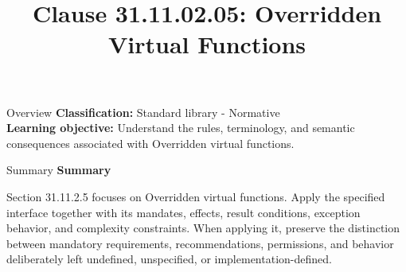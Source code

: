 \documentclass[10pt,letterpaper]{article}
\title{Clause 31.11.02.05: Overridden Virtual Functions}
\author{}
\date{}
\begin{document}
\maketitle
\begin{CornellOverviewBox}{Overview}
\textbf{Classification:} Standard library - Normative\\[2pt]
\textbf{Learning objective:} Understand the rules, terminology, and semantic consequences associated with Overridden virtual functions.
\end{CornellOverviewBox}\begin{CornellSummaryBox}{Summary}
{\sffamily\bfseries\color{Accent} Summary}\par\vspace{3pt}Section 31.11.2.5 focuses on Overridden virtual functions. Apply the specified interface together with its mandates, effects, result conditions, exception behavior, and complexity constraints. When applying it, preserve the distinction between mandatory requirements, recommendations, permissions, and behavior deliberately left undefined, unspecified, or implementation-defined.
\end{CornellSummaryBox}
\end{document}
